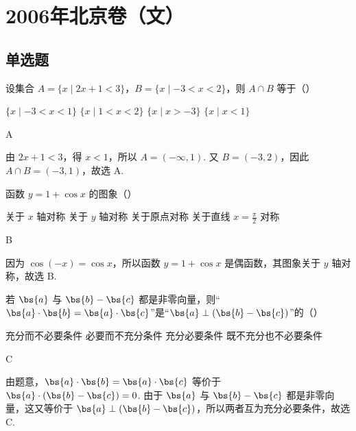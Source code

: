 \chapter{2006年北京卷（文）}
\section{单选题}
\begin{problem}
设集合 \(A = \{x \mid 2x + 1 < 3\}\)，\(B = \{x \mid -3 < x < 2\}\)，则 \(A \cap B\) 等于（\quad）

\choices
    {\(\{x\mid -3 < x < 1\}\)}
    {\(\{x\mid 1 < x < 2\}\)}
    {\( \{x \mid x > -3\} \)}
    {\( \{x \mid x < 1\} \)}
\end{problem}

\begin{answer}
A
\end{answer}

\begin{solution}
由 \(2x+1<3\)，得 \(x<1\)，所以 \(A=(-\infty,1)\). 又 \(B=(-3,2)\)，因此 \(A\cap B=(-3,1)\)，故选 A.
\end{solution}

\begin{problem}
函数 \( y = 1 + \cos x \) 的图象（\quad）

\choices
    {关于 \(x\) 轴对称}
    {关于 \(y\) 轴对称}
    {关于原点对称}
    {关于直线 \(x = \frac{\pi}{2}\) 对称}
\end{problem}

\begin{answer}
B
\end{answer}

\begin{solution}
因为 \(\cos(-x)=\cos x\)，所以函数 \(y=1+\cos x\) 是偶函数，其图象关于 \(y\) 轴对称，故选 B.
\end{solution}

\begin{problem}
若 \(\bs{a}\) 与 \(\bs{b} - \bs{c}\) 都是非零向量，则“\(\bs{a} \cdot \bs{b} = \bs{a} \cdot \bs{c}\)”是“\(\bs{a} \perp (\bs{b} - \bs{c})\)”的（\quad）

\choices
    {充分而不必要条件}
    {必要而不充分条件}
    {充分必要条件}
    {既不充分也不必要条件}
\end{problem}

\begin{answer}
C
\end{answer}

\begin{solution}
由题意，\(\bs{a}\cdot\bs{b}=\bs{a}\cdot\bs{c}\) 等价于 \(\bs{a}\cdot(\bs{b}-\bs{c})=0\). 由于 \(\bs{a}\) 与 \(\bs{b}-\bs{c}\) 都是非零向量，这又等价于 \(\bs{a}\perp(\bs{b}-\bs{c})\)，所以两者互为充分必要条件，故选 C.
\end{solution}

